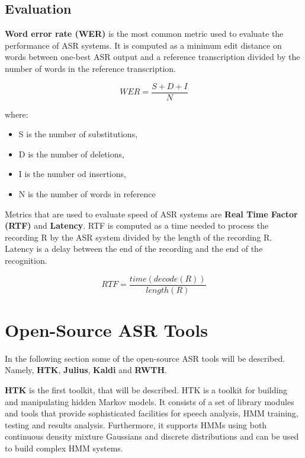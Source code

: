 \BLIND
\BLIND

\subsection{Evaluation}
\textbf{Word error rate (WER)} is the most common metric used to evaluate the performance of ASR systems.
It is computed as a minimum edit distance on words between one-best ASR output and a reference transcription divided by the number of words in the reference transcription.

\begin{equation}
  WER = \frac{S + D + I}{N}
\end{equation}

where:
\begin{itemize}
  \item S is the number of substitutions,
  \item D is the number of deletions,
  \item I is the number od insertions,
  \item N is the number of words in reference
\end{itemize}

Metrics that are used to evaluate speed of ASR systems are \textbf{Real Time Factor (RTF)} and \textbf{Latency}.
RTF is computed as a time needed to process the recording R by the ASR system divided by the length of the recording R.
Latency is a delay between the end of the recording and the end of the recognition.

\begin{equation}
  RTF = \frac{time(decode(R))}{length(R)}
\end{equation}

\section{Open-Source ASR Tools}
In the following section some of the open-source ASR tools will be described.
Namely, \textbf{HTK}, \textbf{Julius}, \textbf{Kaldi} and \textbf{RWTH}.


\textbf{HTK} \cite{young1997htk} is the first toolkit, that will be described.
HTK is a toolkit for building and manipulating hidden Markov models.
It consists of a set of library modules and tools that provide sophisticated facilities for speech analysis, HMM training, testing and results analysis.
Furthermore, it supports HMMs using both continuous density mixture Gaussians and discrete distributions and can be used to build complex HMM systems.

